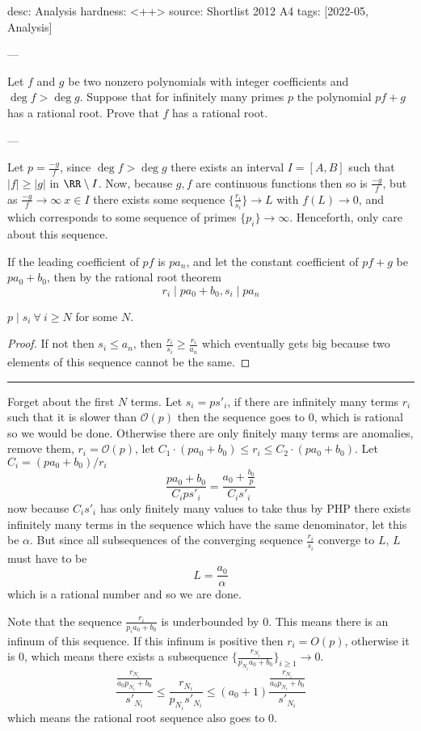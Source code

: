 desc: Analysis
hardness: <++>
source: Shortlist 2012 A4
tags: [2022-05, Analysis]

---

Let $f$ and $g$ be two nonzero polynomials with integer coefficients and $\deg f>\deg g$.  Suppose that for infinitely many primes $p$ the polynomial $pf+g$ has a rational root. Prove that $f$ has a rational root.

---

Let $p = \frac{-g}{f}$, since $\deg f > \deg g$ there exists 
an interval $I = [A,B]$ such that $|f| \geq
|g|$ in $\RR \setminus I$. Now, because $g,f$ are continuous functions
then so is $\frac{-g}{f}$, but as $\frac{-g}{f} \to \infty \ x \in I$
there exists some sequence $\{\frac{r_i}{s_i}\} \to L$ with $f(L) \to 0$, and which
corresponds to some sequence of primes $\{p_i\} \to \infty$. Henceforth,
only care about this sequence.

If the
leading coefficient of $pf$ is $pa_n$, and let the constant coefficient of
$pf+g$ be $pa_0 + b_0$, then by the rational root theorem
\[
  r_i \mid pa_0 + b_0, s_i \mid pa_n
\]
\begin{claim*}
  $p \mid s_i \ \forall \ i \geq N$ for some $N$.
\end{claim*}
\begin{proof}
  If not then $s_i \leq a_n$, then $\frac{r_i}{s_i} \geq
  \frac{r_i}{a_n}$ which eventually gets big because two elements of
  this sequence cannot be the same.
\end{proof}
\hrule

\bigskip
Forget about the first $N$ terms. Let $s_i = ps'_i$, if there are infinitely many terms $r_i$ such that it is slower
than $\mathcal{O}(p)$ then the sequence goes to $0$, which is rational
so we would be done. Otherwise there are only finitely many terms are anomalies, remove them, $r_i = \mathcal{O}(p)$, let
$C_1 \cdot (pa_0+b_0)\leq r_i \leq
C_2 \cdot (pa_0 + b_0)$. Let $C_i = (pa_0+b_0)/r_i$ 
\[
  \frac{pa_0 + b_0}{ C_i p s'_i} = \frac{a_0 + \frac{b_0}{p}}{C_is'_i}
\]
now because $C_i s'_i$ has only finitely many values to take thus by PHP there exists
infinitely many terms in the sequence which have the same denominator, let this be $\alpha$.
But since all subsequences of the converging sequence $\frac{r_i}{s_i}$ converge to $L$,
$L$ must have to be
\[L = \frac{a_0}{\alpha}\]
which is a rational number and so we are done.

Note that the sequence $\frac{r_i}{p_ia_0 + b_0}$ is underbounded by 0. This means 
there is an infinum of this sequence. If this infinum is positive then $r_i = O(p)$,
otherwise it is 0, which means there exists a subsequence $\{\frac{r_{N_i}}{p_{N_i}a_0 + b_0}\}_{i \geq 1} \to 0$.
\[
  \frac{\frac{r_{N_i}}{a_0 p_{N_i} + b_0}}{s'_{N_i}}\leq \frac{r_{N_i}}{p_{N_i}s'_{N_i}} \leq (a_0+1)\frac{\frac{r_{N_i}}{a_0p_{N_i} + b_0}}{s'_{N_i}}
\]
which means the rational root sequence also goes to 0.
